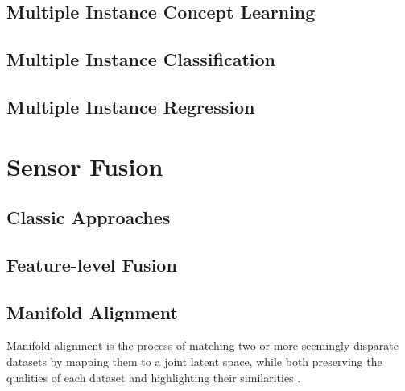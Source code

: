 \subsection{Multiple Instance Concept Learning}

\subsection{Multiple Instance Classification}

\subsection{Multiple Instance Regression}


\section{Sensor Fusion}
	
	\subsection{Classic Approaches}
	
%		
%		
%		
		
	\subsection{Feature-level Fusion}
	
	\subsection{Manifold Alignment}
		Manifold alignment is the process of matching two or more seemingly disparate datasets by mapping them to a joint latent space, while both preserving the qualities of each dataset and highlighting their similarities \cite{Wang2011ManifoldAlignment,Liao2016ManAlignmentHSI,Stanley2019ManAlignmentFeatureCorrespondence}.  
	
